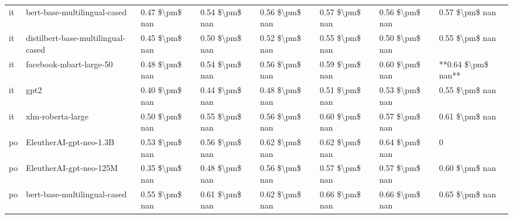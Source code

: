 \begin{tabular}{llllllll}
      it &       bert-base-multilingual-cased & 0.47 \$\textbackslash pm\$ nan &            0.54 \$\textbackslash pm\$ nan &        0.56 \$\textbackslash pm\$ nan &         0.57 \$\textbackslash pm\$ nan &                          0.56 \$\textbackslash pm\$ nan &     0.57 \$\textbackslash pm\$ nan \\
      it & distilbert-base-multilingual-cased & 0.45 \$\textbackslash pm\$ nan &            0.50 \$\textbackslash pm\$ nan &        0.52 \$\textbackslash pm\$ nan &         0.55 \$\textbackslash pm\$ nan &                          0.50 \$\textbackslash pm\$ nan &     0.55 \$\textbackslash pm\$ nan \\
      it &            facebook-mbart-large-50 & 0.48 \$\textbackslash pm\$ nan &            0.54 \$\textbackslash pm\$ nan &        0.56 \$\textbackslash pm\$ nan &         0.59 \$\textbackslash pm\$ nan &                          0.60 \$\textbackslash pm\$ nan & **0.64 \$\textbackslash pm\$ nan** \\
      it &                               gpt2 & 0.40 \$\textbackslash pm\$ nan &            0.44 \$\textbackslash pm\$ nan &        0.48 \$\textbackslash pm\$ nan &         0.51 \$\textbackslash pm\$ nan &                          0.53 \$\textbackslash pm\$ nan &     0.55 \$\textbackslash pm\$ nan \\
      it &                  xlm-roberta-large & 0.50 \$\textbackslash pm\$ nan &            0.55 \$\textbackslash pm\$ nan &        0.56 \$\textbackslash pm\$ nan &         0.60 \$\textbackslash pm\$ nan &                          0.57 \$\textbackslash pm\$ nan &     0.61 \$\textbackslash pm\$ nan \\
      po &            EleutherAI-gpt-neo-1.3B & 0.53 \$\textbackslash pm\$ nan &            0.56 \$\textbackslash pm\$ nan &        0.62 \$\textbackslash pm\$ nan &         0.62 \$\textbackslash pm\$ nan &                          0.64 \$\textbackslash pm\$ nan &                  0 \\
      po &            EleutherAI-gpt-neo-125M & 0.35 \$\textbackslash pm\$ nan &            0.48 \$\textbackslash pm\$ nan &        0.56 \$\textbackslash pm\$ nan &         0.57 \$\textbackslash pm\$ nan &                          0.57 \$\textbackslash pm\$ nan &     0.60 \$\textbackslash pm\$ nan \\
      po &       bert-base-multilingual-cased & 0.55 \$\textbackslash pm\$ nan &            0.61 \$\textbackslash pm\$ nan &        0.62 \$\textbackslash pm\$ nan &         0.66 \$\textbackslash pm\$ nan &                          0.66 \$\textbackslash pm\$ nan &     0.65 \$\textbackslash pm\$ nan \\

\end{tabular}
